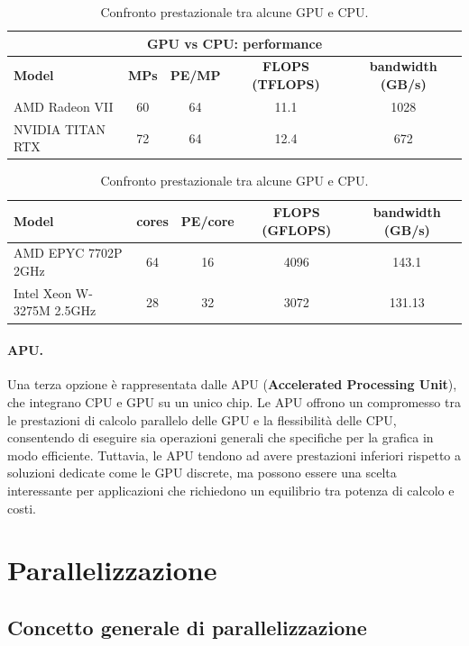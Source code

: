 \begin{table}[h]
\centering
\begin{tabular}{lcccc}
\multicolumn{5}{c}{\textbf{GPU vs CPU: performance}} \\[0.3em]
\hline
\textbf{Model} & \textbf{MPs} & \textbf{PE/MP} & \textbf{FLOPS (TFLOPS)} & \textbf{bandwidth (GB/s)} \\
\hline
AMD Radeon VII   & 60 & 64 & 11.1 & 1028 \\
NVIDIA TITAN RTX & 72 & 64 & 12.4 & 672 \\
\hline
\end{tabular}

\vspace{0.8cm}

\begin{tabular}{lcccc}
\textbf{Model} & \textbf{cores} & \textbf{PE/core} & \textbf{FLOPS (GFLOPS)} & \textbf{bandwidth (GB/s)} \\
\hline
AMD EPYC 7702P 2GHz      & 64 & 16 & 4096 & 143.1 \\
Intel Xeon W-3275M 2.5GHz & 28 & 32 & 3072 & 131.13 \\
\hline
\end{tabular}
\caption{Confronto prestazionale tra alcune GPU e CPU.}
\label{tab:gpu_cpu_performance}
\end{table}

\paragraph{APU.}
Una terza opzione è rappresentata dalle APU (\textbf{Accelerated Processing Unit}), che integrano CPU e GPU su un unico chip. Le APU offrono un compromesso tra le prestazioni di calcolo parallelo delle GPU e la flessibilità delle CPU, consentendo di eseguire sia operazioni generali che specifiche per la grafica in modo efficiente. Tuttavia, le APU tendono ad avere prestazioni inferiori rispetto a soluzioni dedicate come le GPU discrete, ma possono essere una scelta interessante per applicazioni che richiedono un equilibrio tra potenza di calcolo e costi.

\section{Parallelizzazione}

\subsection{Concetto generale di parallelizzazione}

